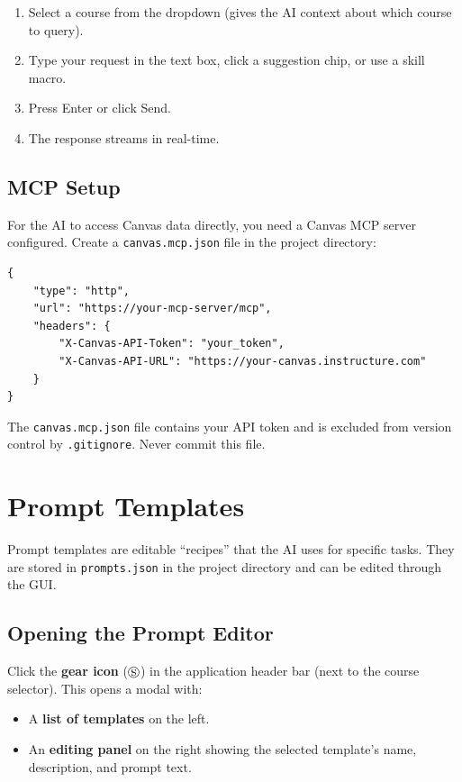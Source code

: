 \documentclass[12pt,letterpaper]{article}
\begin{document}
\begin{enumerate}[leftmargin=*]
    \item Select a course from the dropdown (gives the AI context about which course to query).
    \item Type your request in the text box, click a suggestion chip, or use a skill macro.
    \item Press Enter or click Send.
    \item The response streams in real-time.
\end{enumerate}

\subsection{MCP Setup}

For the AI to access Canvas data directly, you need a Canvas MCP server configured. Create a \texttt{canvas.mcp.json} file in the project directory:

\begin{lstlisting}[language={}]
{
    "type": "http",
    "url": "https://your-mcp-server/mcp",
    "headers": {
        "X-Canvas-API-Token": "your_token",
        "X-Canvas-API-URL": "https://your-canvas.instructure.com"
    }
}
\end{lstlisting}

\begin{warnbox}
The \texttt{canvas.mcp.json} file contains your API token and is excluded from version control by \texttt{.gitignore}. Never commit this file.
\end{warnbox}


\section{Prompt Templates}
\label{sec:prompts}

Prompt templates are editable ``recipes'' that the AI uses for specific tasks. They are stored in \texttt{prompts.json} in the project directory and can be edited through the GUI.

\subsection{Opening the Prompt Editor}

Click the \textbf{gear icon} (\(\circledS\)) in the application header bar (next to the course selector). This opens a modal with:
\begin{itemize}[leftmargin=*]
    \item A \textbf{list of templates} on the left.
    \item An \textbf{editing panel} on the right showing the selected template's name, description, and prompt text.
\end{itemize}
\end{document}
